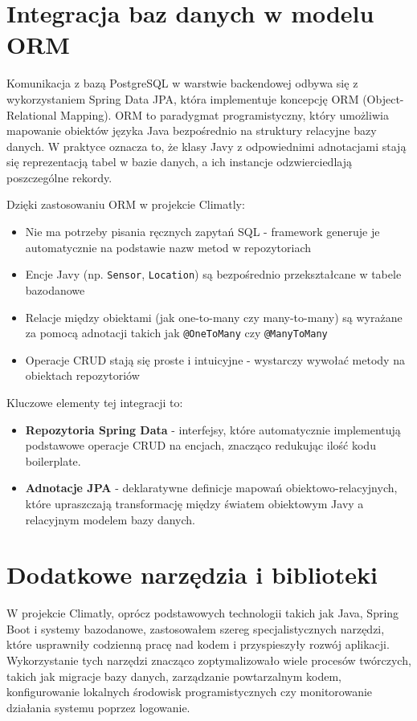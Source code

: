 \documentclass[a4paper,12pt,openany]{book}
\begin{document}
\section{Integracja baz danych w modelu ORM}

Komunikacja z bazą PostgreSQL w warstwie backendowej odbywa się z wykorzystaniem Spring Data JPA, która implementuje koncepcję ORM (Object-Relational Mapping). ORM to paradygmat programistyczny, który umożliwia mapowanie obiektów języka Java bezpośrednio na struktury relacyjne bazy danych. W praktyce oznacza to, że klasy Javy z odpowiednimi adnotacjami stają się reprezentacją tabel w bazie danych, a ich instancje odzwierciedlają poszczególne rekordy.

Dzięki zastosowaniu ORM w projekcie Climatly:
\begin{itemize}[noitemsep,topsep=2pt]
\item Nie ma potrzeby pisania ręcznych zapytań SQL - framework generuje je automatycznie na podstawie nazw metod w repozytoriach
\item Encje Javy (np. \texttt{Sensor}, \texttt{Location}) są bezpośrednio przekształcane w tabele bazodanowe
\item Relacje między obiektami (jak one-to-many czy many-to-many) są wyrażane za pomocą adnotacji takich jak \texttt{@OneToMany} czy \texttt{@ManyToMany}
\item Operacje CRUD stają się proste i intuicyjne - wystarczy wywołać metody na obiektach repozytoriów
\end{itemize}

Kluczowe elementy tej integracji to:
\begin{itemize}[noitemsep,topsep=2pt]
\item \textbf{Repozytoria Spring Data} - interfejsy, które automatycznie implementują podstawowe operacje CRUD na encjach, znacząco redukując ilość kodu boilerplate.
\item \textbf{Adnotacje JPA} - deklaratywne definicje mapowań obiektowo-relacyjnych, które upraszczają transformację między światem obiektowym Javy a relacyjnym modelem bazy danych.
\end{itemize}


\section{Dodatkowe narzędzia i biblioteki}

W projekcie Climatly, oprócz podstawowych technologii takich jak Java, Spring Boot i systemy bazodanowe, zastosowałem szereg specjalistycznych narzędzi, które usprawniły codzienną pracę nad kodem i przyspieszyły rozwój aplikacji. Wykorzystanie tych narzędzi znacząco zoptymalizowało wiele procesów twórczych, takich jak migracje bazy danych, zarządzanie powtarzalnym kodem, konfigurowanie lokalnych środowisk programistycznych czy monitorowanie działania systemu poprzez logowanie.
\end{document}
